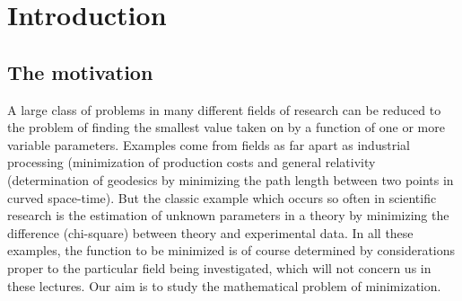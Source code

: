 
\def\UTG{\lower.8ex\hbox{$\sim$}\kern-.8em\raise.25ex\hbox{$G$}\;}
\def\UTI{\lower.8ex\hbox{$\sim$}\kern-.8em\raise.25ex\hbox{$I$}\;}
\def\UTV{\lower.8ex\hbox{$\sim$}\kern-.7em\raise.25ex\hbox{$V$}\;}
\def\UTA{\lower.8ex\hbox{$\sim$}\kern-.8em\raise.25ex\hbox{$A$}\;}
\def\UTI{\lower.8ex\hbox{$\sim$}\kern-.6em\raise.25ex\hbox{$I$}\;}
\def\UTd{\lower.8ex\hbox{$\sim$}\kern-.8em\raise.25ex\hbox{$d$}\;}
\def\UTf{\lower.8ex\hbox{$\sim$}\kern-.7em\raise.40ex\hbox{$f$}\;}
\def\UTT{\lower.8ex\hbox{$\sim$}\kern-.8em\raise.25ex\hbox{$T$}\;}
\def\UTD{\lower.8ex\hbox{$\sim$}\kern-.8em\raise.25ex\hbox{$D$}\;}
\chapter{Introduction}
\section{The motivation}
 
A large class of problems in many different fields of research can
be reduced to the problem of finding the smallest value taken on by a
function of one or more variable parameters.  Examples come from fields
as far apart as industrial processing (minimization of production costs
and general relativity (determination of geodesics by minimizing the
path length between two points in curved space-time).  But the classic
example which occurs so often in scientific research is the estimation of
unknown parameters in a theory by minimizing the difference (chi-square)
between theory and experimental data.  In all these examples, the function
to be minimized is of course determined by considerations proper to
the particular field being investigated, which will  not concern us in these lectures.
Our aim is to study the mathematical problem of minimization.
 
